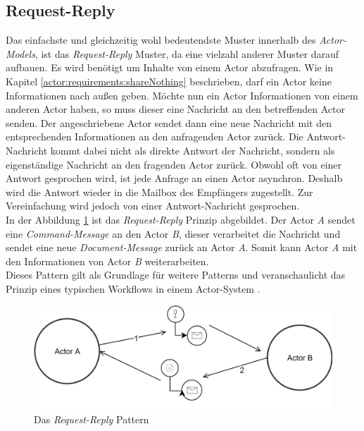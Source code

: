 \subsection{Request-Reply} 
Das einfachste und gleichzeitig wohl bedeutendste Muster innerhalb des \textit{Actor-Models}, ist das \textit{Request-Reply} Muster, da eine vielzahl anderer Muster darauf aufbauen. Es wird benötigt um Inhalte von einem Actor abzufragen. Wie in Kapitel \ref{actor:requirements:shareNothing} beschrieben, darf ein Actor keine Informationen nach außen geben. Möchte nun ein Actor Informationen von einem anderen Actor haben, so muss dieser eine Nachricht an den betreffenden Actor senden. Der angeschriebene Actor sendet dann eine neue Nachricht mit den entsprechenden Informationen an den anfragenden Actor zurück. Die Antwort-Nachricht kommt dabei nicht als direkte Antwort der Nachricht, sondern als eigenständige Nachricht an den fragenden Actor zurück. Obwohl oft von einer Antwort gesprochen wird, ist jede Anfrage an einen Actor asynchron. Deshalb wird die Antwort wieder in die Mailbox des Empfängers zugestellt. Zur Vereinfachung wird jedoch von einer Antwort-Nachricht gesprochen. \\
In der Abbildung \ref{fig:actor:patterns:requestReply} ist das \textit{Request-Reply} Prinzip abgebildet. Der Actor \textit{A} sendet eine \textit{Command-Message} an den Actor \textit{B}, dieser verarbeitet die Nachricht und sendet eine neue \textit{Document-Message} zurück an Actor \textit{A}. Somit kann Actor \textit{A} mit den Informationen von Actor \textit{B} weiterarbeiten. \\
Dieses Pattern gilt als Grundlage für weitere Patterns und veranschaulicht das Prinzip eines typischen Workflows in einem Actor-System \citep{Vernon2015ReactiveAkka}.
\begin{figure}
  \centering
  \includegraphics[width=\linewidth]{gfx/actor/patterns/requestReplay}
  \caption{Das \textit{Request-Reply} Pattern}
  \label{fig:actor:patterns:requestReply}
\end{figure}

